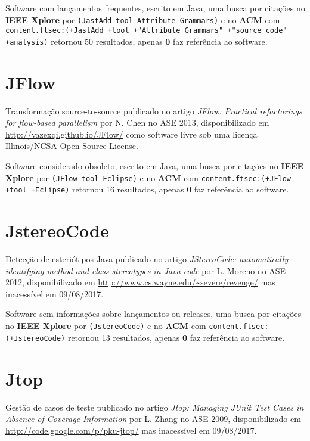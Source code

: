 Software com lançamentos frequentes,
escrito em Java,
uma busca por citações no {\bf IEEE Xplore} por
\texttt{(JastAdd tool Attribute Grammars)}
e no {\bf ACM} com
\texttt{content.ftsec:(+JastAdd +tool +"Attribute Grammars" +"source code" +analysis)}
retornou
50 resultados, apenas
{\bf 0} faz referência ao software.



\section{JFlow}

Transformação source-to-source
publicado no artigo {\it JFlow: Practical refactorings for flow-based parallelism}
por N. Chen
no ASE 2013,
disponibilizado em \url{http://vazexqi.github.io/JFlow/}
como software livre
sob uma licença Illinois/NCSA Open Source License.

Software considerado obsoleto,
escrito em Java,
uma busca por citações no {\bf IEEE Xplore} por
\texttt{(JFlow tool Eclipse)}
e no {\bf ACM} com
\texttt{content.ftsec:(+JFlow +tool +Eclipse)}
retornou
16 resultados, apenas
{\bf 0} faz referência ao software.



\section{JstereoCode}

Detecção de esteriótipos Java
publicado no artigo {\it JStereoCode: automatically identifying method and class stereotypes in Java code}
por L. Moreno
no ASE 2012,
disponibilizado em \url{http://www.cs.wayne.edu/~severe/revenge/}
mas inacessível em 09/08/2017.

Software sem informações sobre lançamentos ou releases,
uma busca por citações no {\bf IEEE Xplore} por
\texttt{(JstereoCode)}
e no {\bf ACM} com
\texttt{content.ftsec:(+JstereoCode)}
retornou
13 resultados, apenas
{\bf 0} faz referência ao software.



\section{Jtop}

Gestão de casos de teste
publicado no artigo {\it Jtop: Managing JUnit Test Cases in Absence of Coverage Information}
por L. Zhang
no ASE 2009,
disponibilizado em \url{http://code.google.com/p/pku-jtop/}
mas inacessível em 09/08/2017.

